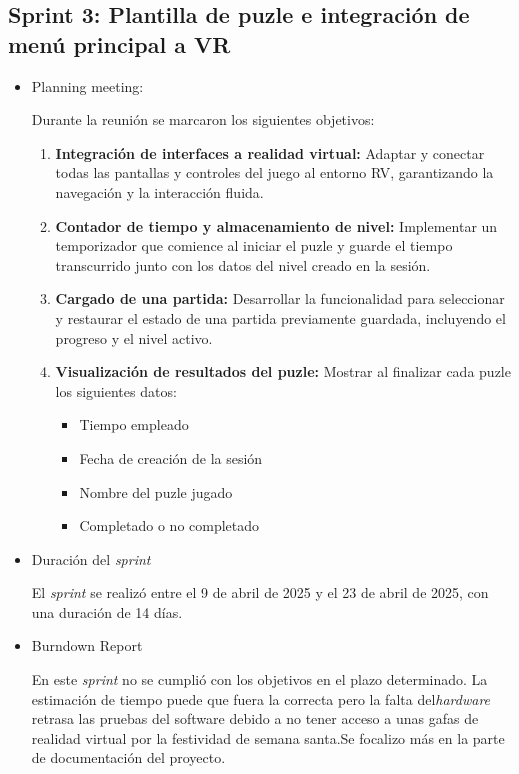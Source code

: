 \subsection{\textbf{Sprint 3: Plantilla de puzle e integración de menú principal a VR } }
\begin{itemize}
    \item {Planning meeting:}
    
Durante la reunión se marcaron los siguientes objetivos:
\begin{enumerate}
  \item \textbf{Integración de interfaces a realidad virtual:}  
    Adaptar y conectar todas las pantallas y controles del juego al entorno RV, garantizando la navegación y la interacción fluida.

  \item \textbf{Contador de tiempo y almacenamiento de nivel:}  
    Implementar un temporizador que comience al iniciar el puzle y guarde el tiempo transcurrido junto con los datos del nivel creado en la sesión.

  \item \textbf{Cargado de una partida:}  
    Desarrollar la funcionalidad para seleccionar y restaurar el estado de una partida previamente guardada, incluyendo el progreso y el nivel activo.

  \item \textbf{Visualización de resultados del puzle:}  
    Mostrar al finalizar cada puzle los siguientes datos:  
    \begin{itemize}
      \item Tiempo empleado  
      \item Fecha de creación de la sesión  
      \item Nombre del puzle jugado
      \item Completado o no completado
    \end{itemize}
\end{enumerate}
    \item {Duración del \textit{sprint}}
    
El \textit{sprint } se realizó entre el 9 de abril de 2025 y el 23 de abril de 2025, con una duración de 14 días.
    \item {Burndown Report}
    
En este \textit{sprint} no se cumplió con los objetivos en el plazo determinado. La estimación de tiempo puede que fuera la correcta pero la falta del\textit{hardware} retrasa las pruebas del software debido a no tener acceso a unas gafas de realidad virtual por la festividad de semana santa.Se focalizo más en la parte de documentación del proyecto.

\end{itemize}

